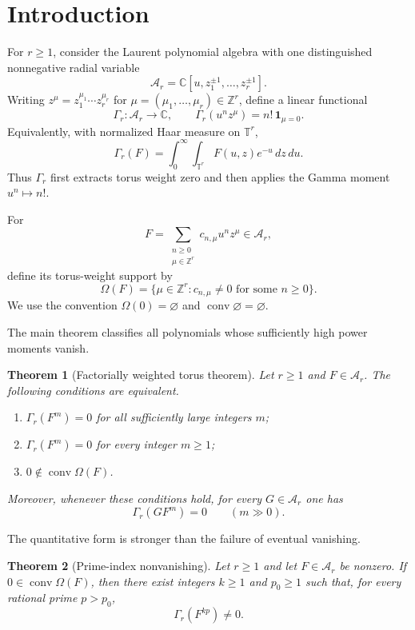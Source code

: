 \documentclass[11pt]{article}
\numberwithin{equation}{section}
\newtheorem{theorem}{Theorem}[section]
\theoremstyle{definition}
\theoremstyle{remark}
\newcommand{\C}{\mathbb C}
\newcommand{\Z}{\mathbb Z}
\newcommand{\T}{\mathbb T}
\newcommand{\A}{\mathcal A}
\newcommand{\conv}{\operatorname{conv}}
\begin{document}
\section{Introduction}

For $r\ge1$, consider the Laurent polynomial algebra with one distinguished
nonnegative radial variable
\[
  \A_r=\C[u,z_1^{\pm1},\ldots,z_r^{\pm1}].
\]
Writing $z^\mu=z_1^{\mu_1}\cdots z_r^{\mu_r}$ for
$\mu=(\mu_1,\ldots,\mu_r)\in\Z^r$, define a linear functional
\[
  \Gamma_r:\A_r\longrightarrow\C,
  \qquad
  \Gamma_r(u^n z^\mu)=n!\,\mathbf 1_{\mu=0}.
\]
Equivalently, with normalized Haar measure on $\T^r$,
\begin{equation}\label{eq:gamma-integral-intro}
  \Gamma_r(F)
  =\int_0^\infty\int_{\T^r}F(u,z)e^{-u}\,dz\,du.
\end{equation}
Thus $\Gamma_r$ first extracts torus weight zero and then applies the Gamma
moment $u^n\mapsto n!$.

For
\[
  F=\sum_{\substack{n\ge0\\ \mu\in\Z^r}}c_{n,\mu}u^nz^\mu\in\A_r,
\]
define its torus-weight support by
\begin{equation}\label{eq:omega-intro}
  \Omega(F)
  =\{\mu\in\Z^r:c_{n,\mu}\ne0\text{ for some }n\ge0\}.
\end{equation}
We use the convention $\Omega(0)=\varnothing$ and
$\conv\varnothing=\varnothing$.

The main theorem classifies all polynomials whose sufficiently high power
moments vanish.

\begin{theorem}[Factorially weighted torus theorem]\label{thm:main}
Let $r\ge1$ and $F\in\A_r$.  The following conditions are equivalent.
\begin{enumerate}[label=\textup{(\roman*)}]
  \item $\Gamma_r(F^m)=0$ for all sufficiently large integers $m$;
  \item $\Gamma_r(F^m)=0$ for every integer $m\ge1$;
  \item $0\notin\conv\Omega(F)$.
\end{enumerate}
Moreover, whenever these conditions hold, for every $G\in\A_r$ one has
\[
  \Gamma_r(GF^m)=0\qquad(m\gg0).
\]
\end{theorem}

The quantitative form is stronger than the failure of eventual vanishing.

\begin{theorem}[Prime-index nonvanishing]\label{thm:prime-nonvanishing}
Let $r\ge1$ and let $F\in\A_r$ be nonzero.  If
$0\in\conv\Omega(F)$, then there exist integers $k\ge1$ and $p_0\ge1$ such
that, for every rational prime $p>p_0$,
\[
  \Gamma_r(F^{kp})\ne0.
\]
\end{theorem}
\end{document}
